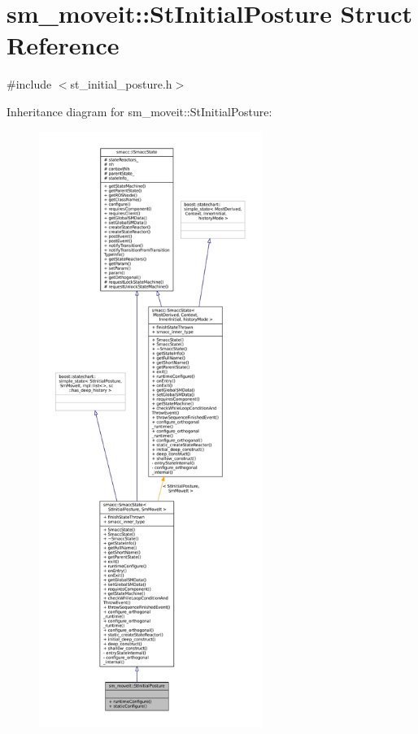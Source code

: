 \hypertarget{structsm__moveit_1_1StInitialPosture}{}\section{sm\+\_\+moveit\+:\+:St\+Initial\+Posture Struct Reference}
\label{structsm__moveit_1_1StInitialPosture}


{\ttfamily \#include $<$st\+\_\+initial\+\_\+posture.\+h$>$}



Inheritance diagram for sm\+\_\+moveit\+:\+:St\+Initial\+Posture\+:
\nopagebreak
\begin{figure}[H]
\begin{center}
\leavevmode
\includegraphics[height=550pt]{structsm__moveit_1_1StInitialPosture__inherit__graph}
\end{center}
\end{figure}


